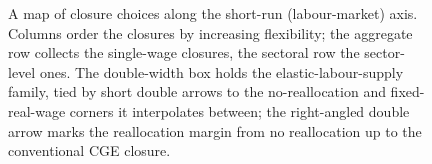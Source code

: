 \begin{figure}[htbp]
\caption{A map of closure choices along the short-run (labour-market)
  axis. Columns order the closures by increasing flexibility; the
  aggregate row collects the single-wage closures, the sectoral row the
  sector-level ones. The double-width box holds the elastic-labour-supply
  family, tied by short double arrows to the no-reallocation and
  fixed-real-wage corners it interpolates between; the right-angled
  double arrow marks the reallocation margin from no reallocation up to
  the conventional CGE closure.}
\label{fig:flexibility-map}
\end{figure}